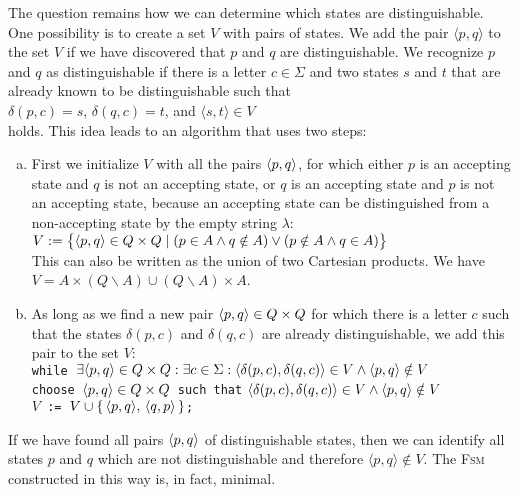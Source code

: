 The question remains how we can determine which states are distinguishable.
One possibility is to create a set $V$ with pairs of states.  We add the pair $\langle p, q \rangle$ to the set
$V$ if we have discovered that $p$ and $q$ are distinguishable.  We recognize $p$ and $q$ as distinguishable if
there is a letter $c\in\Sigma$ and two states $s$ and $t$ that are already known to be distinguishable such that 
\\[0.2cm]
\hspace*{1.3cm}
$\delta(p,c) = s$, \quad $\delta(q,c) = t$, \quad and \quad $\langle s, t \rangle \in V$
\\[0.2cm]
holds. This idea leads to an algorithm that uses two steps:
\begin{enumerate}[(a)]
\item First we initialize $V$ with all the pairs $\pair(p,q)$, for which either $p$ is an accepting state and
      $q$ is not an accepting state, or $q$ is an accepting state and $p$ is not an accepting state,
      because an accepting state can be distinguished from a non-accepting state by the empty string
      $\lambda$: 
      \\[0.2cm]
      \hspace*{1.3cm}
      $V := \bigl\{\pair(p,q) \in Q \times Q \mid (p \in A \wedge q \notin A) \vee 
      (p \notin A \wedge q \in A) \bigr\}$
      \\[0.2cm]
      This can also be written as the union of two Cartesian products. We have
      \\[0.2cm]
      \hspace*{1.3cm}
      $V = A \times (Q \backslash A) \cup (Q \backslash A) \times A$.
\item As long as we find a new pair $\pair(p,q) \in Q \times Q$ for which there is a letter $c$ such that the
      states $\delta(p,c)$ and $\delta(q,c)$ are already distinguishable, we add this pair to the set $V$:  
      \\[0.2cm]
      \hspace*{1.3cm} 
      \texttt{while $\exists \pair(p,q) \in Q \times Q: \exists c \in \Sigma:\langle\delta(p,c),
        \delta(q,c)\rangle \in V \wedge \pair(p,q) \notin V$ } \\
      \hspace*{1.8cm}
      \texttt{choose $\pair(p,q) \in Q \times Q$ such that} $\langle\delta(p,c),
      \delta(q,c)\rangle \in V \wedge \pair(p,q) \notin V$ \\
      \hspace*{2.3cm}
      \texttt{$V$ := $V \cup \{\, \pair(p,q),\, \pair(q,p)\, \}$;} \\
\end{enumerate}
If we have found all pairs $\pair(p,q)$ of distinguishable states, then we can identify all states $p$ and $q$
which are not distinguishable and therefore $\langle p, q \rangle \not\in V$.   The \textsc{Fsm} constructed in
this way is, in fact, minimal.  

